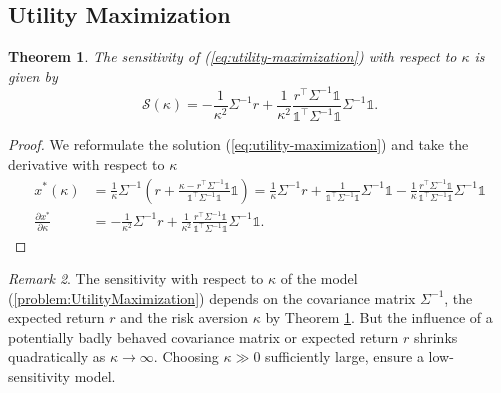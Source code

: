 \documentclass[a4paper, english, 11pt, onecolumn, oneside, final]{article}
\numberwithin{equation}{section}   %
\newcommand{\one}{\mathds 1}
\newcommand{\precision}{\Sigma^{-1}}
\newcommand{\B}{r^\top\Sigma^{-1}\one}
\newcommand{\C}{\one^\top\Sigma^{-1}\one}
\theoremstyle{plain}
\newtheorem{theorem}             {Theorem}[section]
\theoremstyle{definition}
\theoremstyle{remark}
\newtheorem{remark}     [theorem]{Remark}
\begin{document}
\subsection{Utility Maximization}
\begin{theorem}
\label{thm:UtilityMaximizationSensitivity}
    The sensitivity of (\ref{eq:utility-maximization}) with respect to $\kappa$ is given by
    \begin{equation*}
        \mathcal{S}(\kappa) = -\frac{1}{\kappa^2}\precision r + \frac{1}{\kappa^2}\frac{\B}{\C}\precision\one.
    \end{equation*}
\end{theorem}
\begin{proof}
    We reformulate the solution (\ref{eq:utility-maximization}) and take the derivative with respect to $\kappa$
    \begin{equation*}
        \begin{aligned}
            x^*(\kappa) 
            &= \frac{1}{\kappa}\precision\left(r+\frac{\kappa-\B}{\C}\one\right)
            = \frac{1}{\kappa}\precision r + \frac{1}{\C}\precision\one - \frac{1}{\kappa}\frac{\B}{\C}\precision \one \\
            \frac{\partial x^*}{\partial\kappa}
            &= -\frac{1}{\kappa^2}\precision r + \frac{1}{\kappa^2}\frac{\B}{\C}\precision\one.
        \end{aligned}
    \end{equation*}
\end{proof}
\begin{remark}
     The sensitivity with respect to $\kappa$ of the model (\ref{problem:UtilityMaximization}) depends on the covariance matrix $\Sigma^{-1}$, the expected return $r$ and the risk aversion $\kappa$ by Theorem \ref{thm:UtilityMaximizationSensitivity}. But the influence of a potentially badly behaved covariance matrix or expected return $r$ shrinks quadratically as $\kappa\to\infty$. Choosing $\kappa\gg0$ sufficiently large, ensure a low-sensitivity model.
\end{remark}
\end{document}
